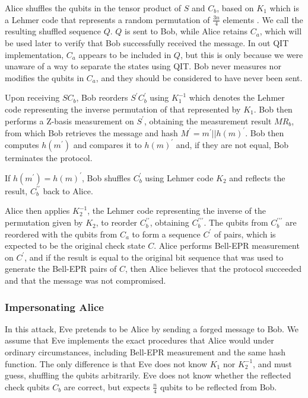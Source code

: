 \documentclass[conference,compsoc]{IEEEtran}
\begin{document}
Alice shuffles the qubits in the tensor product of $S$ and $C_{b}$,
based on $K_{1}$ which is a Lehmer code that represents a random permutation of $\frac{3n}{4}$ elements \cite{Rauschmayer}.
We call the resulting shuffled sequence $Q$. $Q$ is sent to Bob, while Alice retains $C_{a}$,
which will be used later to verify that Bob successfully received the message. In out QIT implementation,
$C_{a}$ appears to be included in $Q$, but this is only because we were unaware of a way to separate the states
using QIT. Bob never measures nor modifies the qubits in $C_{a}$, and they should be considered to have never been sent.

Upon receiving $SC_{b}$, Bob reorders $S^{\prime}C_{b}^{\prime}$
using $K_{1}^{-1}$ which denotes the Lehmer code representing the inverse permutation of that represented by $K_{1}$.
Bob then performs a Z-basis measurement on $S^{\prime}$,
obtaining the measurement result $MR_{b}$, from which Bob retrieves
the message and hash $M^{\prime}=m^{\prime}||h\left(m\right)^{\prime}$.
Bob then computes $h\left(m^{\prime}\right)$ and compares it to $h\left(m\right)^{\prime}$
and, if they are not equal, Bob terminates the protocol.

If $h\left(m^{\prime}\right)=h\left(m\right)^{\prime}$, Bob shuffles
$C_{b}^{\prime}$ using Lehmer code $K_{2}$ and reflects the result, $C_{b}^{\prime\prime}$
back to Alice.

Alice then applies $K_{2}^{-1}$, the Lehmer code representing the inverse
of the permutation given by $K_{2}$, to reorder $C_{b}^{\prime\prime}$, obtaining
$C_{b}^{\prime\prime\prime}$. The qubits from $C_{b}^{\prime\prime\prime}$ are reordered
with the qubits from $C_{a}$ to form a sequence $C^{\prime}$ of pairs, which is expected to be the
original check state $C$. Alice performs Bell-EPR measurement on $C^{\prime}$, and if the result
is equal to the original bit sequence that was used to generate the Bell-EPR pairs of $C$,
then Alice believes that the protocol succeeded and that the message was not compromised.

\subsubsection{Impersonating Alice}

In this attack, Eve pretends to be Alice by sending a forged message to Bob.
We assume that Eve implements the exact procedures that Alice
would under ordinary circumstances, including Bell-EPR
measurement and the same hash function. The only difference is that Eve
does not know $K_{1}$ nor $K_{2}^{-1}$, and must guess, shuffling the
qubits arbitrarily. Eve does not know whether the reflected check qubits $C_{b}$
are correct, but expects $\frac{n}{4}$ qubits to be reflected from Bob.
\end{document}
